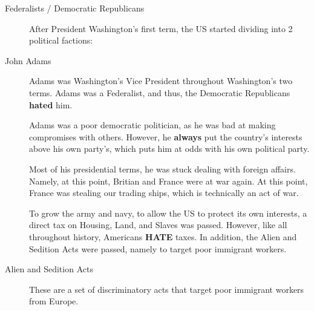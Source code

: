 \begin{description}
\item[Federalists / Democratic Republicans] After President Washington's first term, the US started dividing into 2 political factions:

\item[John Adams] Adams was Washington's Vice President throughout Washington's two terms.
  Adams was a Federalist, and thus, the Democratic Republicans \textbf{hated} him.

  Adams was a poor democratic politician, as he was bad at making compromises with others.
  However, he \textbf{always} put the country's interests above his own party's, which puts him at odds with his own political party.

  Most of his presidential terms, he was stuck dealing with foreign affairs.
  Namely, at this point, Britian and France were at war again.
  At this point, France was stealing our trading ships, which is technically an act of war.

  To grow the army and navy, to allow the US to protect its own interests, a direct tax on Housing, Land, and Slaves was passed.
  However, like all throughout history, Americans \textbf{HATE} taxes.
  In addition, the Alien and Sedition Acts were passed, namely to target poor immigrant workers.

\item[Alien and Sedition Acts] These are a set of discriminatory acts that target poor immigrant workers from Europe.


\end{description}
